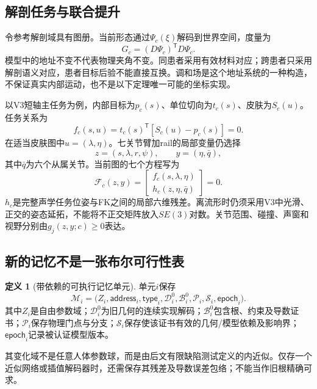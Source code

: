 \documentclass[UTF8,11pt,a4paper,fontset=fandol]{ctexart}
\numberwithin{equation}{section}
\theoremstyle{definition}
\newtheorem{definition}[theorem]{定义}
\newcommand{\T}{^{\mathsf T}}
\begin{document}
\subsection{解剖任务与联合提升}
令参考解剖域具有图册。当前形态通过$\Psi_c(\xi)$解码到世界空间，度量为
\begin{equation}
G_c=(D\Psi_c)\T D\Psi_c.
\end{equation}
模型中的地址不变不代表物理夹角不变。同患者采用有效材料对应；跨患者只采用解剖语义对应，患者目标后验不能直接互换。调和场是这个地址系统的一种构造，不保证真实内部运动，也不是以下定理唯一可能的坐标实现。

以V3短轴主任务为例，内部目标为$p_c(s)$、单位切向为$t_c(s)$、皮肤为$S_c(u)$。任务关系为
\begin{equation}
 f_c(s,u)=t_c(s)\T[S_c(u)-p_c(s)]=0.
 \label{eq:task}
\end{equation}
在适当皮肤图中$u=(\lambda,\eta)$。七关节臂加rail的局部变量仍选择
\begin{equation}
 z=(s,\lambda,r,\psi),\qquad y=(\eta,\bar q),
\end{equation}
其中$\bar q$为六个从属关节。当前图的七个方程写为
\begin{equation}
 \mathcal F_c(z,y)=
 \begin{bmatrix}
 f_c(s,\lambda,\eta)\\
 h_c(z,\eta,\bar q)
 \end{bmatrix}=0.
 \label{eq:implicit}
\end{equation}
$h_c$是完整声学任务位姿与FK之间的局部六维残差。离流形时仍须采用V3中光滑、正交的姿态延拓，不能将不正交矩阵放入$SE(3)$对数。关节范围、碰撞、声窗和视野分别由$g_j(z,y;c)\ge0$表达。

\subsection{新的记忆不是一张布尔可行性表}
\begin{definition}[带依赖的可执行记忆单元]
单元$i$保存
\begin{equation}
\mathscr M_i=
\bigl(Z_i,\mathsf{address}_i,\mathsf{type}_i,
\mathcal D_i^0,\mathcal B_i^0,\mathcal P_i,
\mathcal S_i,\mathsf{epoch}_i\bigr).
\end{equation}
其中$Z_i$是自由参数域；$\mathcal D_i^0$为旧几何的连续实现解码；$\mathcal B_i^0$包含根、约束及导数证书；$\mathcal P_i$保存物理门点与分支；$\mathcal S_i$保存使该证书有效的几何/模型依赖及影响界；$\mathsf{epoch}_i$记录被认证模型版本。
\end{definition}
其变化域不是任意人体参数球，而是由后文有限缺陷测试定义的内近似。仅存一个近似网络或插值解码器时，还需保存其残差及导数误差包络；不能当作旧根精确可求。
\end{document}
